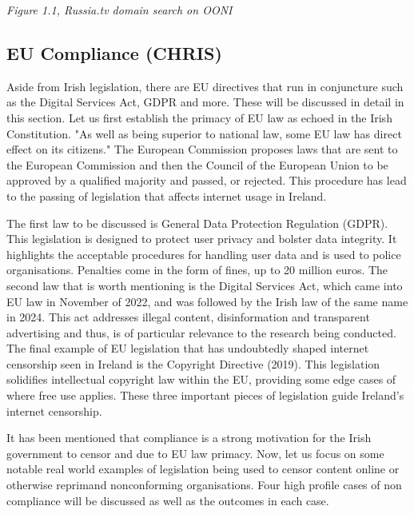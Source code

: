 \centerline{\textit{Figure 1.1, Russia.tv domain search on OONI}}

\subsection{EU Compliance (CHRIS)}
\label{sec:Chris-EU-Compliance}

Aside from Irish legislation, there are EU directives that run in conjuncture such as the Digital Services Act, GDPR and more. These will be discussed in detail in this section. Let us first establish the primacy of EU law as echoed in the Irish Constitution. "As well as being superior to national law, some EU law has direct effect on its citizens." \cite{citizensinformation2025} The European Commission proposes laws that are sent to the European Commission and then the Council of the European Union to be approved by a qualified majority and passed, or rejected. \cite{europa2025} This procedure has lead to the passing of legislation that affects internet usage in Ireland. 

The first law to be discussed is General Data Protection Regulation (GDPR). This legislation is designed to protect user privacy and bolster data integrity. It highlights the acceptable procedures for handling user data and is used to police organisations. Penalties come in the form of fines, up to 20 million euros. \cite{gdprinfo2025} 
The second law that is worth mentioning is the Digital Services Act, which came into EU law in November of 2022, and was followed by the Irish law of the same name in 2024. \cite{enterprisegovie2025} \cite{irishstatutebook2024} This act addresses illegal content, disinformation and transparent advertising and thus, is of particular relevance to the research being conducted. 
The final example of EU legislation that has undoubtedly shaped internet censorship seen in Ireland is the Copyright Directive (2019). This legislation solidifies intellectual copyright law within the EU, providing some edge cases of where free use applies. \cite{EUCopyright} These three important pieces of legislation guide Ireland's internet censorship. 

It has been mentioned that compliance is a strong motivation for the Irish government to censor and due to EU law primacy. Now, let us focus on some notable real world examples of legislation being used to censor content online or otherwise reprimand nonconforming organisations. Four high profile cases of non compliance will be discussed as well as the outcomes in each case. 

